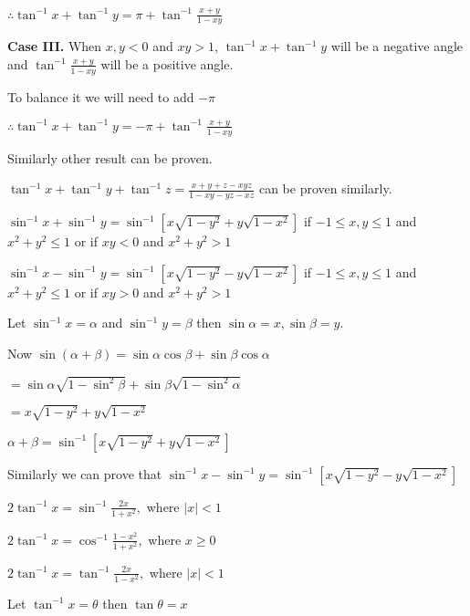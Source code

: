   $\therefore \tan^{-1}x + \tan^{-1}y = \pi + \tan^{-1}\frac{x + y}{1 - xy}$

  {\bf Case III.} When $x, y< 0$ and $xy > 1$, $\tan^{-1}x + \tan^{-1}y$ will be a negative angle and
  $\tan^{-1}\frac{x + y}{1 - xy}$ will be a positive angle.

  To balance it we will need to add $-\pi$

  $\therefore \tan^{-1}x + \tan^{-1}y = -\pi + \tan^{-1}\frac{x + y}{1 - xy}$

  Similarly other result can be proven.
\stopproof

$\tan^{-1}x + \tan^{-1}y + \tan^{-1}z = \frac{x + y + z - xyz}{1 - xy - yz - xz}$ can be proven similarly.

\starttheorem
  \startitemize[n]
  \item $\sin^{-1}x + \sin^{-1}y = \sin^{-1}[x\sqrt{1 - y^2} + y\sqrt{1 - x^2}]$ if $-1\leq x, y\leq 1$ and $x^2 +
    y^2\leq 1$ or if $xy < 0$ and $x^2 + y^2 > 1$

  \item $\sin^{-1}x - \sin^{-1}y = \sin^{-1}[x\sqrt{1 - y^2} - y\sqrt{1 - x^2}]$ if $-1\leq x, y\leq 1$ and $x^2 +
    y^2\leq 1$ or if $xy > 0$ and $x^2 + y^2 > 1$
  \stopitemize
 \stoptheorem

 \startproof
   Let $\sin^{-1}x = \alpha$ and $\sin^{-1}y = \beta$ then $\sin\alpha = x, \sin\beta = y.$

   Now $\sin(\alpha + \beta) = \sin\alpha\cos\beta + \sin\beta\cos\alpha$

   $= \sin\alpha\sqrt{1 - \sin^2\beta} + \sin\beta\sqrt{1 - \sin^2\alpha}$

   $= x\sqrt{1 - y^2} + y\sqrt{1 - x^2}$

   $\alpha + \beta = \sin^{-1}[x\sqrt{1 - y^2} + y\sqrt{1 - x^2}]$

   Similarly we can prove that $\sin^{-1}x - \sin^{-1}y = \sin^{-1}[x\sqrt{1 - y^2} - y\sqrt{1 - x^2}]$
 \stopproof

\starttheorem
  \startitemize[n]
  \item $2\tan^{-1}x = \sin^{-1}\frac{2x}{1 + x^2},$ where $|x|< 1$

  \item $2\tan^{-1}x = \cos^{-1}\frac{1 - x^2}{1 + x^2},$ where $x\geq 0$

  \item $2\tan^{-1}x = \tan^{-1}\frac{2x}{1 - x^2},$ where $|x| < 1$
  \stopitemize
\stoptheorem

\startproof
  \startitemize[n]
  \item Let $\tan^{-1}x = \theta$ then $\tan\theta = x$

